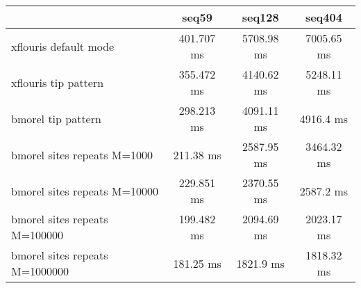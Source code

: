 \begin{tabular}{|l|c|c|c|}
\hline
 & seq59 & seq128 & seq404 \\
\hline
xflouris default mode & 401.707 ms & 5708.98 ms & 7005.65 ms\\
\hline
xflouris tip pattern & 355.472 ms & 4140.62 ms & 5248.11 ms\\
\hline
bmorel tip pattern & 298.213 ms & 4091.11 ms & 4916.4 ms\\
\hline
bmorel sites repeats M=1000 & 211.38 ms & 2587.95 ms & 3464.32 ms\\
\hline
bmorel sites repeats M=10000 & 229.851 ms & 2370.55 ms & 2587.2 ms\\
\hline
bmorel sites repeats M=100000 & 199.482 ms & 2094.69 ms & 2023.17 ms\\
\hline
bmorel sites repeats M=1000000 & 181.25 ms & 1821.9 ms & 1818.32 ms\\
\hline
\end{tabular}

